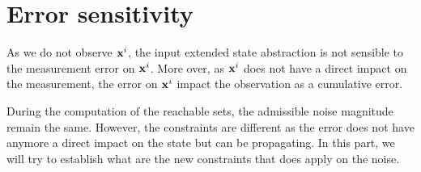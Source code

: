 \newcommand{\xo}{\vect{x}^o}%
\newcommand{\xr}{\vect{x}^r}%

\newcommand{\Ao}{A_o}%
\newcommand{\Ar}{A_r}%
\newcommand{\Aro}{A_{ro}}%

\newcommand{\Bo}{B_o}%
\newcommand{\Br}{B_r}%

\newcommand{\Eo}{E_o}%
\newcommand{\Er}{E_r}%
\newcommand{\Ero}{E_{ro}}%

\newcommand{\Xr}{X_r}%

\newcommand{\Xrinv}{\mathcal{X}_r}%
\newcommand{\xrinf}{\minf{\x}_r}%
\newcommand{\xrsup}{\msup{\x}_r}%


\newcommand{\Wsup}{\msup{W}}
\newcommand{\Winf}{\minf{W}}
\newcommand{\Wk}{W_k}

\renewcommand{\wr}{\vect{w}^r}
\newcommand{\wrsup}{\msup{\vect{w}}^r}
\newcommand{\wrinf}{\minf{\vect{w}}^r}
\newcommand{\Wrsup}{\msup{W}^r}
\newcommand{\Wrinf}{\minf{W}^r}
\newcommand{\Wrk}{W^r_k}

\newcommand{\z}{\vect{z}}%
\newcommand{\zk}{\z_k}%
\newcommand{\zkn}{\z_{k+1}}%

\newcommand{\xkn}{\x_{k+1}}%
\newcommand{\xk}{\x_{k}}%
\newcommand{\uk}{\u_{k}}%
\newcommand{\wk}{\w_{k}}%
\newcommand{\yk}{\y_{k}}%
\newcommand{\ykn}{\y_{k+1}}%

\newcommand{\Z}{\mathbf{z}}
\newcommand{\Zk}{\Z_k}
\newcommand{\Zkn}{\Z_{k+1}}
\newcommand{\hk}{\vect{h}_{k}}
\newcommand{\h}{\vect{h}}
\newcommand{\wnoise}{\msup{\sigma}}

\newcommand{\size}{N}
\newcommand{\norminf}[1]{\left\|#1\right\|_{\infty}}


\section{Error sensitivity}
As we do not observe $ \mathbf{x}^i$, the input extended state abstraction is not sensible to the measurement error on $ \mathbf{x}^i$. More over, as $ \mathbf{x}^i$ does not have a direct impact on the measurement, the error on $ \mathbf{x}^i$ impact the observation as a cumulative error.

During the computation of the reachable sets, the admissible noise magnitude remain the same. However, the constraints are different as the error does not have anymore a direct impact on the state but can be propagating.
In this part, we will try to establish what are the new constraints that does apply on the noise.

